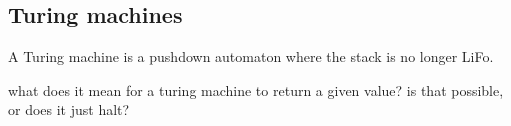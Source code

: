 \subsection{Turing machines}

A Turing machine is a pushdown automaton where the stack is no longer LiFo.

what does it mean for a turing machine to return a given value? is that possible, or does it just halt?
